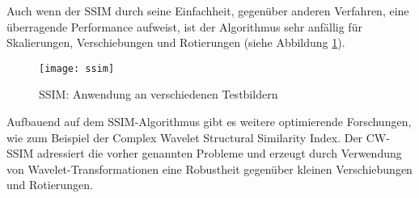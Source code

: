 Auch wenn der SSIM durch seine Einfachheit, gegenüber anderen Verfahren, eine
überragende Performance aufweist, ist der Algorithmus sehr anfällig für
Skalierungen, Verschiebungen und Rotierungen (siehe Abbildung \ref{fig:ssim}).
\parencite{ssim-quality-assessment}

\begin{figure}[H]
    \centering
    \texttt{[image: ssim]}
    \caption{SSIM: Anwendung an verschiedenen Testbildern}
    \label{fig:ssim}
\end{figure}

Aufbauend auf dem SSIM-Algorithmus gibt es weitere optimierende Forschungen, wie
zum Beispiel der Complex Wavelet Structural Similarity Index. Der CW-SSIM
adressiert die vorher genannten Probleme und erzeugt durch Verwendung von
Wavelet-Transformationen eine Robustheit gegenüber kleinen Verschiebungen und
Rotierungen. \parencite{ssim-complex-wavelet}

